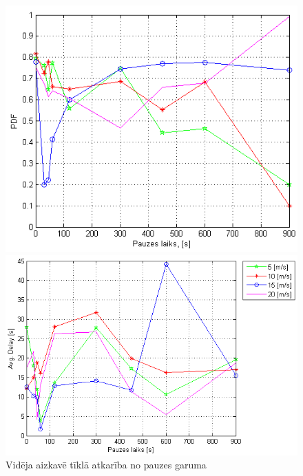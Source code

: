 \begin{figure}[htb!]
\begin{minipage}[t]{0.47\linewidth}
\centering
\includegraphics[scale=0.55]{./graph/pdf.png}
\end{minipage}%
\hspace{0.2cm}
\begin{minipage}[t]{0.47\linewidth}
\centering
\includegraphics[scale=0.55]{./graph/avgD.png}
\end{minipage}
\caption{Vidēja aizkavē tīklā atkarība no pauzes garuma}\label{fig:pause}
\end{figure}
